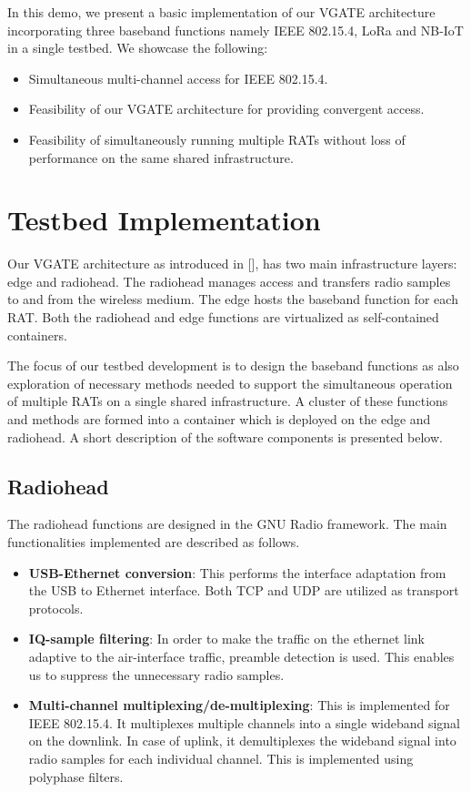 \documentclass[10pt,emptycopyrightspace]{ewsn-proc}
\begin{document}
In this demo, we present a basic implementation of our VGATE architecture incorporating three baseband functions namely IEEE 802.15.4, LoRa and NB-IoT in a single testbed. We showcase the following:
\begin{itemize}
	\item Simultaneous multi-channel access for IEEE 802.15.4.
	\item Feasibility of our VGATE architecture for providing convergent access.
	\item Feasibility of simultaneously running multiple RATs without loss of performance on the same shared infrastructure.
\end{itemize}

\section{Testbed Implementation}
\label{sec:implementation}
Our VGATE architecture as introduced in [], has two main infrastructure layers: edge and radiohead. The radiohead manages access and transfers radio samples to and from the wireless medium.  The edge hosts the baseband function for each RAT. Both the radiohead and edge functions are virtualized as self-contained containers. 

The focus of our testbed development is to design the baseband functions as also exploration of necessary methods needed to support the simultaneous operation of multiple RATs on a single shared infrastructure. A cluster of these functions and methods are formed into a container which is deployed on the edge and radiohead. A short description of the software components is presented below. 

\subsection{Radiohead}
The radiohead functions are designed in the GNU Radio framework. The main functionalities implemented are described as follows.
\begin{itemize}
	\item \textbf{USB-Ethernet conversion}: This performs the interface adaptation from the USB to Ethernet interface. Both TCP and UDP are utilized as transport protocols.
	
	\item \textbf{IQ-sample filtering}: In order to make the traffic on the ethernet link adaptive to the air-interface traffic, preamble detection is used. This enables us to suppress the unnecessary radio samples.
	
	\item \textbf{ Multi-channel multiplexing/de-multiplexing}: This is implemented for IEEE 802.15.4. It multiplexes multiple channels into a single wideband signal on the downlink. In case of uplink, it demultiplexes the wideband signal into radio samples for each individual channel. This is implemented using polyphase filters.
	
\end{itemize}
\end{document}
